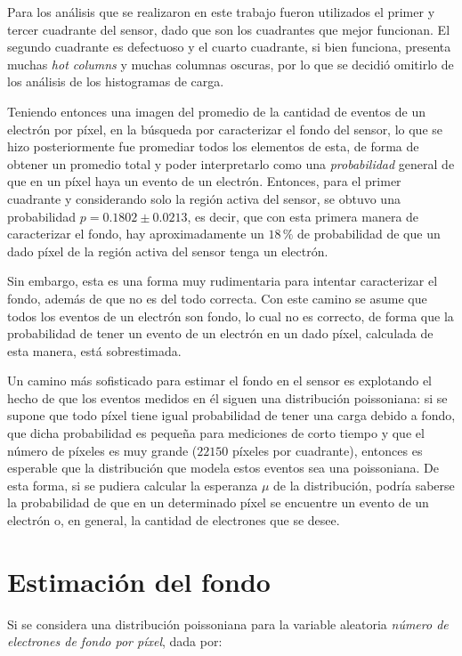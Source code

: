 Para los análisis que se realizaron en este trabajo fueron utilizados el primer y tercer cuadrante del sensor, dado que son los cuadrantes que mejor funcionan. El segundo cuadrante es defectuoso y el cuarto cuadrante, si bien funciona, presenta muchas \textit{hot columns} y muchas columnas oscuras, por lo que se decidió omitirlo de los análisis de los histogramas de carga.


Teniendo entonces una imagen del promedio de la cantidad de eventos de un electrón por píxel, en la búsqueda por caracterizar el fondo del sensor, lo que se hizo posteriormente fue promediar todos los elementos de esta, de forma de obtener un promedio total y poder interpretarlo como una \textit{probabilidad} general de que en un píxel haya un evento de un electrón. Entonces, para el primer cuadrante y considerando solo la región activa del sensor, se obtuvo una probabilidad $p = 0.1802 \pm 0.0213$, es decir, que con esta primera manera de caracterizar el fondo, hay aproximadamente un $18\,\%$ de probabilidad de que un dado píxel de la región activa del sensor tenga un electrón.

Sin embargo, esta es una forma muy rudimentaria para intentar caracterizar el fondo, además de que no es del todo correcta. Con este camino se asume que todos los eventos de un electrón son fondo, lo cual no es correcto, de forma que la probabilidad de tener un evento de un electrón en un dado píxel, calculada de esta manera, está sobrestimada. 

Un camino más sofisticado para estimar el fondo en el sensor es explotando el hecho de que los eventos medidos en él siguen una distribución poissoniana: si se supone que todo píxel tiene igual probabilidad de tener una carga debido a fondo, que dicha probabilidad es pequeña para mediciones de corto tiempo y que el número de píxeles es muy grande ($22150$ píxeles por cuadrante), entonces es esperable que la distribución que modela estos eventos sea una poissoniana. De esta forma, si se pudiera calcular la esperanza $\mu$ de la distribución, podría saberse la probabilidad de que en un determinado píxel se encuentre un evento de un electrón o, en general, la cantidad de electrones que se desee.

\section{Estimación del fondo}
\noindent Si se considera una distribución poissoniana para la variable aleatoria \textit{número de electrones de fondo por píxel}, dada por:

